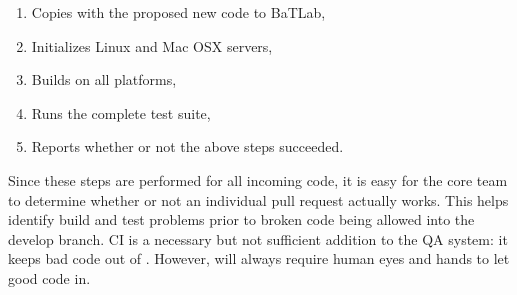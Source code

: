 \begin{enumerate}
    \item Copies \Cyclus with the proposed new code to BaTLab,
    \item Initializes Linux and Mac OSX servers,
    \item Builds \Cyclus on all platforms,
    \item Runs the complete \Cyclus test suite,
    \item Reports whether or not the above steps succeeded.
\end{enumerate}

Since these steps are performed for all incoming code, it is easy for the
\Cyclus core team to determine whether or not an individual pull request
actually works. This helps identify build and test problems prior to
broken code being allowed into the develop branch. \gls{CI} is a necessary
but not sufficient addition to the \Cyclus \gls{QA}
system: it keeps bad code out of \Cyclus. However, \Cyclus will always
require human eyes and hands to let good code in.

